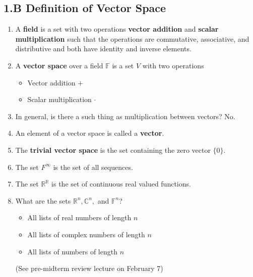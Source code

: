 \documentclass[11pt]{article}
\begin{document}
\subsection*{1.B Definition of Vector Space}
\begin{enumerate}
	\item A \textbf{field} is a set with two operations \textbf{vector addition} and \textbf{scalar multiplication} such that the operations are commutative, associative, and distributive and both have identity and inverse elements.
	\item A \textbf{vector space} over a field $\mathbb{F}$ is a set $V$ with two operations
	\begin{itemize}
		\item Vector addition $+$
		\item Scalar multiplication $\cdot$
	\end{itemize}
	\item In general, is there a such thing as multiplication between vectors? No.
	\item An element of a vector space is called a \textbf{vector}.
	\item The \textbf{trivial vector space} is the set containing the zero vector $\{0\}$.
	\item The set $F^{\infty}$ is the set of all sequences.
	\item The set $\mathbb{R}^{\mathbb{R}}$ is the set of continuous real valued functions.
	\item What are the sets $\mathbb{R}^n, \mathbb{C}^n,$ and $\mathbb{F}^n$?
	\begin{itemize}
		\item All lists of real numbers of length $n$
		\item All lists of complex numbers of length $n$
		\item All lists of numbers of length $n$
	\end{itemize}
	
	(See pre-midterm review lecture on February 7)
\end{enumerate}
\end{document}

